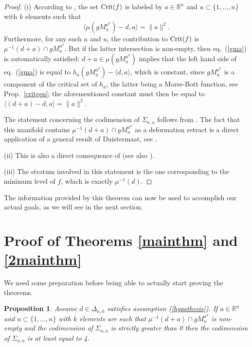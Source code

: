\documentclass[12pt]{amsart}
\newtheorem{prop}[thm]{Proposition}
\theoremstyle{definition}
\theoremstyle{remark}
\newcommand{\RR}{\mathbb R}
\begin{document}
\begin{proof}
(i) According to \cite[Thm.~4.16]{Ki}, the set ${\rm Crit}(f)$ is labeled by $a\in \RR^n$ and $u\subset \{1, \ldots, n\}$ with $k$ elements
such that \begin{equation}\label{gma}\langle \mu(gM^{a^\sigma}_u)-d, a\rangle =\|a\|^2.\end{equation}
Furthermore, for any such $a$ and $u$, the contribution to ${\rm Crit}(f)$ is
$\mu^{-1}(d+a) \cap gM^{a^\sigma}_u$. But if the latter intersection is non-empty, then eq.~(\ref{gma}) is automatically satisfied:
$d+a\in \mu(g M_u^{a^\sigma})$ implies that the left hand side of eq.~(\ref{gma}) is equal to $h_a(gM_u^{a^\sigma})-\langle d,a \rangle$, which is constant, since $gM_u^{a^\sigma}$ is a component of the critical set of $h_a$, the latter being a Morse-Bott function, see Prop.~\ref{critgen}; the aforementioned constant must then be equal to $\langle (d+a)-d, a\rangle =\|a\|^2$. 

The statement concerning the codimension of $\Sigma_{a, u}$ follows from \cite[Rem.~4.17]{Ki}. The fact that this manifold contains $\mu^{-1}(d+a) \cap gM_{u}^{{a}^\sigma}$
as a deformation retract is a direct application of a general result of Duistermaat, see \cite{Le}. 

(ii) This is also a direct consequence of \cite[Thm.~4.16]{Ki} (see also \cite[Lemma 10.7]{Ki}).  

(iii) The stratum involved in this statement is the one corresponding to the minimum level of $f$, which is exactly
$\mu^{-1}(d)$. 

\end{proof}


The information provided by this theorem can now be used to accomplish our actual goals, as we will see in the next section.



\section{Proof of Theorems \ref{mainthm} and \ref{2mainthm}} 


We need some preparation before being able to actually start proving the theorems.

\begin{prop} \label{prop1ton}
Assume $d\in \Delta_{n,k}$ satisfies  assumption (\ref{hypothesis}). If $a\in \RR^n$ and $u\subset \{1, \ldots, n\}$ with $k$ elements are such that 
$\mu^{-1}(d+a) \cap g M_{u}^{{a}^\sigma}$ 
is non-empty and the codimension of $\Sigma_{a,u}$ is strictly greater than 0
then the codimension of $\Sigma_{a,u}$  is at least equal to 4.
\end{prop}
\end{document}
